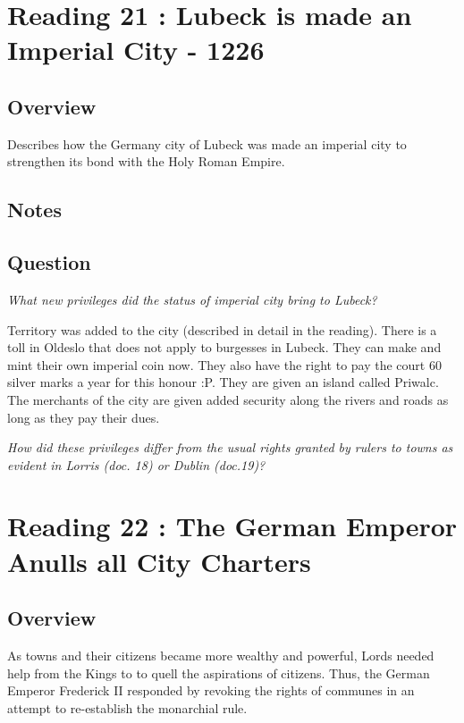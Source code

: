 \documentclass[12pt]{article}
\begin{document}
{\section*{Reading 21 : Lubeck is made an Imperial City - 1226}

\subsection*{Overview}

Describes how the Germany city of Lubeck was made an imperial city to strengthen its bond with the Holy Roman Empire. 

\subsection*{Notes}

\subsection*{Question}

\textit{What new privileges did the status of imperial city bring to Lubeck?}

Territory was added to the city (described in detail in the reading). There is a toll in Oldeslo that does not apply to burgesses in Lubeck. They can make and mint their own imperial coin now. They also have the right to pay the court 60 silver marks a year for this honour :P. They are given an island called Priwalc. The merchants of the city are given added security along the rivers and roads as long as they pay their dues.

\textit{How did these privileges differ from the usual rights granted by rulers to towns as evident in Lorris (doc. 18) or Dublin (doc.19)?}

\section*{Reading 22 : The German Emperor Anulls all City Charters}

\subsection*{Overview}

As towns and their citizens became more wealthy and powerful, Lords needed help from the Kings to to quell the aspirations of citizens. Thus, the German Emperor Frederick II responded by revoking the rights of communes in an attempt to re-establish the monarchial rule. 

}
\end{document}
